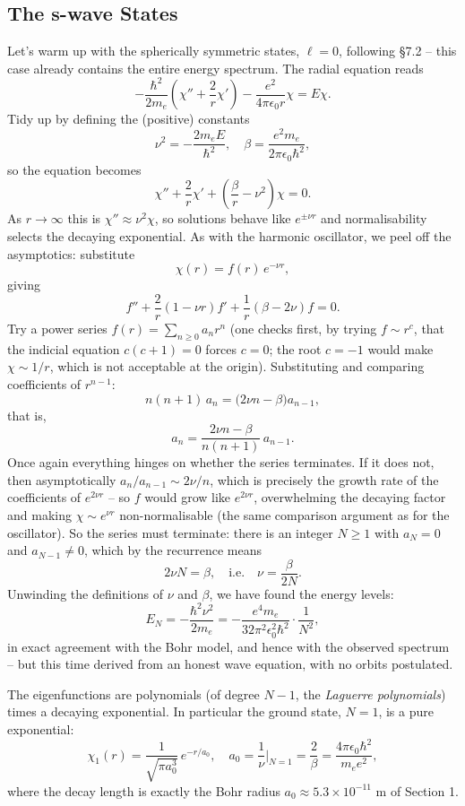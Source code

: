 \documentclass[a4paper]{scrartcl}
\begin{document}
\subsection{The s-wave States}

Let's warm up with the spherically symmetric states, $\ell = 0$, following \S 7.2 -- this case already contains the entire energy spectrum. The radial equation reads
$$
-\frac{\hbar^2}{2 m_e}\left( \chi'' + \frac{2}{r} \chi' \right) - \frac{e^2}{4 \pi \epsilon_0 r} \chi = E \chi.
$$
Tidy up by defining the (positive) constants
$$
\nu^2 = -\frac{2 m_e E}{\hbar^2}, \quad \beta = \frac{e^2 m_e}{2 \pi \epsilon_0 \hbar^2},
$$
so the equation becomes
$$
\chi'' + \frac{2}{r} \chi' + \left( \frac{\beta}{r} - \nu^2 \right) \chi = 0.
$$
As $r \rightarrow \infty$ this is $\chi'' \approx \nu^2 \chi$, so solutions behave like $e^{\pm \nu r}$ and normalisability selects the decaying exponential. As with the harmonic oscillator, we peel off the asymptotics: substitute
$$
\chi(r) = f(r) \, e^{-\nu r},
$$
giving
$$
f'' + \frac{2}{r}(1 - \nu r) f' + \frac{1}{r}(\beta - 2 \nu) f = 0.
$$
Try a power series $f(r) = \sum_{n \geq 0} a_n r^n$ (one checks first, by trying $f \sim r^c$, that the indicial equation $c(c+1) = 0$ forces $c = 0$; the root $c = -1$ would make $\chi \sim 1/r$, which is not acceptable at the origin). Substituting and comparing coefficients of $r^{n-1}$:
$$
n(n+1) \, a_n = \big( 2 \nu n - \beta \big) a_{n - 1},
$$
that is,
$$
a_n = \frac{2 \nu n - \beta}{n(n+1)} \, a_{n-1}.
$$
Once again everything hinges on whether the series terminates. If it does not, then asymptotically $a_n / a_{n-1} \sim 2\nu/n$, which is precisely the growth rate of the coefficients of $e^{2 \nu r}$ -- so $f$ would grow like $e^{2\nu r}$, overwhelming the decaying factor and making $\chi \sim e^{\nu r}$ non-normalisable (the same comparison argument as for the oscillator). So the series must terminate: there is an integer $N \geq 1$ with $a_{N} = 0$ and $a_{N - 1} \neq 0$, which by the recurrence means
$$
2 \nu N = \beta, \quad \text{i.e.} \quad \nu = \frac{\beta}{2N}.
$$
Unwinding the definitions of $\nu$ and $\beta$, we have found the energy levels:
$$
E_N = -\frac{\hbar^2 \nu^2}{2 m_e} = -\frac{e^4 m_e}{32 \pi^2 \epsilon_0^2 \hbar^2} \cdot \frac{1}{N^2},
$$
in exact agreement with the Bohr model, and hence with the observed spectrum -- but this time derived from an honest wave equation, with no orbits postulated.

The eigenfunctions are polynomials (of degree $N - 1$, the \emph{Laguerre polynomials}) times a decaying exponential. In particular the ground state, $N = 1$, is a pure exponential:
$$
\chi_1(r) = \frac{1}{\sqrt{\pi a_0^3}} \, e^{-r/a_0}, \quad a_0 = \frac{1}{\nu}\bigg|_{N=1} = \frac{2}{\beta} = \frac{4 \pi \epsilon_0 \hbar^2}{m_e e^2},
$$
where the decay length is exactly the Bohr radius $a_0 \approx 5.3 \times 10^{-11}$ m of Section 1.
\end{document}
